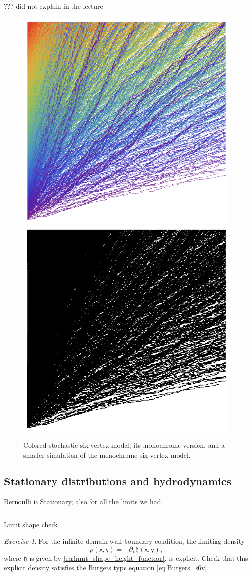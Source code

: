 \documentclass[letterpaper,11pt,oneside,reqno]{article}
\numberwithin{equation}{section}
\theoremstyle{definition}
\theoremstyle{remark}
\newtheorem{exercise}{Exercise}[section]
\begin{document}
??? did not explain in the lecture


\begin{figure}[htpb]
	\centering
	\includegraphics[width=.3\textwidth]{./images/CS6V.png}
	\quad
	\includegraphics[width=.3\textwidth]{./images/S6V.png}
	\quad
	\caption{Colored stochastic six vertex model, its monochrome version,
	and a smaller simulation of the monochrome six vertex model.}
	\label{fig:CS6V}
\end{figure}


\subsection{Stationary distributions and hydrodynamics}
\label{sub:hydrodynamic_analysis}




Bernoulli is Stationary; also for all the limits we had.

\begin{equation}
	\label{eq:Burgers_s6v}
\end{equation}

Limit shape check


\begin{exercise}
	For the infinite domain wall boundary condition,
	the limiting 
	density
	\begin{equation*}
		\rho(\mathsf{x},\mathsf{y})=-\partial_\mathsf{x} \mathfrak{h}(\mathsf{x},\mathsf{y}),
	\end{equation*}
	where $\mathfrak{h}$ is 
	given by \eqref{eq:limit_shape_height_function},
	is explicit. Check that this explicit density
	satisfies the Burgers type equation
	\eqref{eq:Burgers_s6v}.
\end{exercise}
\end{document}
